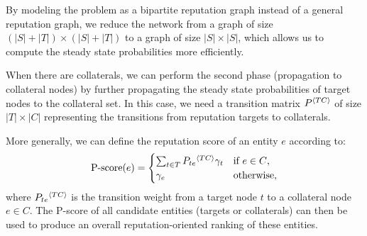\documentclass[notitlepage]{svjour3}
\begin{document}
By modeling the problem as a bipartite reputation graph instead of a general reputation graph, we reduce the network from a graph of size $(|S|+|T|)\times (|S|+|T|)$ to a graph of size $|S|\times |S|$, which allows us to compute the steady state probabilities more efficiently. %


When there are collaterals, we can perform the second phase (propagation to collateral nodes) 
by further propagating the steady state probabilities of target nodes to the collateral set. 
In this case, we need a transition matrix $P{^{\langle TC \rangle}}$ of size $|T|\times |C|$ representing
the transitions from reputation targets to collaterals.

%
More generally, we can define the reputation score of an entity $e$ according to:
\begin{align}\label{eq:pscore}
  \text{P-score}(e) = \begin{cases}
	\sum_{t \in T} P_{te}{^{\langle TC \rangle}} \gamma_t & \text{if $e \in C$,}\\
    \gamma_e &\text{otherwise,}
  \end{cases}
\end{align}
\noindent where $P_{te}{^{\langle TC \rangle}}$ is the transition weight from a target node $t$ to a collateral node $e \in C$. The P-score of all candidate entities (targets or collaterals) can then be used to produce an overall reputation-oriented ranking of these entities.
\end{document}
